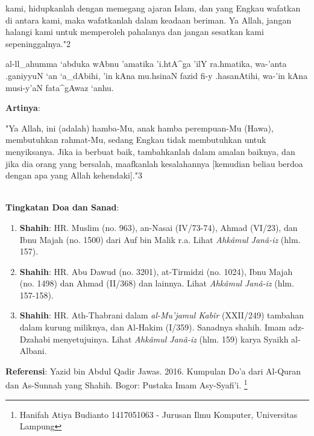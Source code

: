 \documentclass[a4paper,12pt]{article}
\begin{document}
kami, hidupkanlah dengan memegang ajaran Islam, dan yang Engkau wafatkan di
antara kami, maka wafatkanlah dalam keadaan beriman. Ya Allah, jangan 
halangi kami untuk memperoleh pahalanya dan jangan sesatkan kami 
sepeninggalnya."{\scriptsize 2}\\
\begin{arabtext}
\noindent
al-ll_ahumma `abduka wAbnu 'amatika 'i.htA^ga 'ilY ra.hmatika, wa-'anta 
.ganiyyuN `an `a_dAbihi, 'in kAna mu.hsinaN fazid fi-y .hasanAtihi, wa-'in 
kAna musi-y'aN fata^gAwaz `anhu.\\
\end{arabtext}
\noindent
\textbf{Artinya}:
\par
\indent
"Ya Allah, ini (adalah) hamba-Mu, anak hamba perempuan-Mu (Hawa), 
membutuhkan rahmat-Mu, sedang Engkau tidak membutuhkan untuk menyiksanya. 
Jika ia berbuat baik, tambahkanlah dalam amalan baiknya, dan jika dia orang
yang bersalah, maafkanlah kesalahannya [kemudian beliau berdoa dengan apa 
yang Allah kehendaki]."{\scriptsize 3}\\\\
\par
\noindent
\textbf{Tingkatan Doa dan Sanad}:
\begin{enumerate}
\item \textbf{Shahih}: HR. Muslim (no. 963), an-Nasai (IV/73-74), Ahmad 
(VI/23), dan Ibnu Majah (no. 1500) dari Auf bin Malik r.a. Lihat 
\textit{Ahk\^{a}mul Jan\^{a}-iz} (hlm. 157).
\item \textbf{Shahih}: HR. Abu Dawud (no. 3201), at-Tirmidzi (no. 1024), 
Ibnu Majah (no. 1498) dan Ahmad (II/368) dan lainnya. Lihat 
\textit{Ahk\^{a}mul Jan\^{a}-iz} (hlm. 157-158).
\item \textbf{Shahih}: HR. Ath-Thabrani dalam \textit{al-Mu'jamul 
Kab\^{i}r} (XXII/249) tambahan dalam kurung miliknya, dan Al-Hakim (I/359).
Sanadnya shahih. Imam adz-Dzahabi menyetujuinya. Lihat \textit{Ahk\^{a}mul 
Jan\^{a}-iz} (hlm. 159) karya Syaikh al-Albani.
\end{enumerate}
\textbf{Referensi}: Yazid bin Abdul Qadir Jawas. 2016. Kumpulan Do'a dari
Al-Quran dan As-Sunnah yang Shahih. Bogor: Pustaka Imam Asy-Syafi'i.
\footnote{Hanifah Atiya Budianto 1417051063 - Jurusan Ilmu Komputer,
Universitas Lampung}
\end{document}
